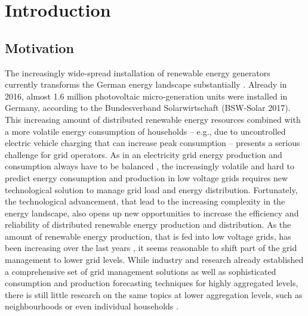 
\section{Introduction}\label{Sec:Intro}




\subsection{Motivation}\label{Sec:Intro;Subsec:Motivation}

The increasingly wide-spread installation of renewable energy generators currently transforms the German energy landscape substantially \citep{Bayer:2018}. Already in 2016, almost 1.6 million photovoltaic micro-generation units were installed in Germany, according to the Bundesverband Solarwirtschaft \citep{}(BSW-Solar 2017). This increasing amount of distributed renewable energy resources combined with a more volatile energy consumption of households – e.g., due to uncontrolled electric vehicle charging that can increase peak consumption \citep{Fitzgerald:2016,Floch:2017} – presents a serious challenge for grid operators. As in an electricity grid energy production and consumption always have to be balanced \citep{Weron:2006}, the increasingly volatile and hard to predict energy consumption and production in low voltage grids requires new technological solution to manage grid load and energy distribution.
Fortunately, the technological advancement, that lead to the increasing complexity in the energy landscape, also opens up new opportunities to increase the efficiency and reliability of distributed renewable energy production and distribution. As the amount of renewable energy production, that is fed into low voltage grids, has been increasing over the last years \citep{Bayer:2018}, it seems reasonable to shift part of the grid management to lower grid levels. While industry and research already established a comprehensive set of grid management solutions as well as sophisticated consumption and production forecasting techniques for highly aggregated levels, there is still little research on the same topics at lower aggregation levels, such as neighbourhoods or even individual households \citep{Meer:2018}.
